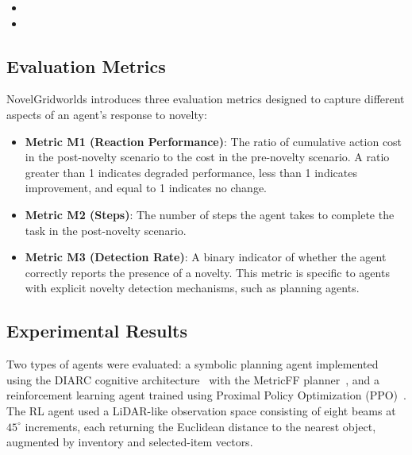 \begin{itemize}[leftmargin=*]
    \item {}

    \item {}
\end{itemize}


\subsection{Evaluation Metrics}
\label{sec:ngw_metrics}

NovelGridworlds introduces three evaluation metrics designed to capture different aspects of an agent's response to novelty:
\begin{itemize}[leftmargin=*]
    \item \textbf{Metric M1 (Reaction Performance)}: The ratio of cumulative action cost in the post-novelty scenario to the cost in the pre-novelty scenario. A ratio greater than 1 indicates degraded performance, less than 1 indicates improvement, and equal to 1 indicates no change.
    \item \textbf{Metric M2 (Steps)}: The number of steps the agent takes to complete the task in the post-novelty scenario.
    \item \textbf{Metric M3 (Detection Rate)}: A binary indicator of whether the agent correctly reports the presence of a novelty. This metric is specific to agents with explicit novelty detection mechanisms, such as planning agents.
\end{itemize}


\subsection{Experimental Results}
\label{sec:ngw_results}

Two types of agents were evaluated: a symbolic planning agent implemented using the DIARC cognitive architecture~\citep{schermerhorn2006diarc, scheutz2019diarc} with the MetricFF planner~\citep{hoffmann2003metricff}, and a reinforcement learning agent trained using Proximal Policy Optimization (PPO)~\citep{schulman2017proximal}. The RL agent used a LiDAR-like observation space consisting of eight beams at $45^\circ$ increments, each returning the Euclidean distance to the nearest object, augmented by inventory and selected-item vectors.

